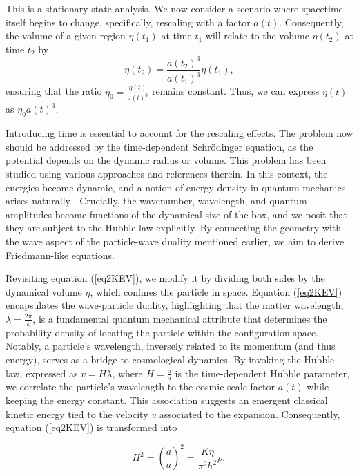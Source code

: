 \documentclass{article}
\begin{document}
This is a stationary state analysis. We now consider a scenario where spacetime itself begins to change, specifically, rescaling with a factor $a(t)$. Consequently, the volume of a given region $\eta(t_1)$ at time $t_1$ will relate to the volume $\eta(t_2)$ at time $t_2$ by
\begin{equation}
\eta(t_2) = \frac{a(t_2)^3}{a(t_1)^3}\eta(t_1), \label{eq:VolumeScale}
\end{equation}
ensuring that the ratio $\eta_0 = \frac{\eta(t)}{a(t)^3}$ remains constant. Thus, we can express $\eta(t)$ as $\eta_0 a(t)^3$.

Introducing time is essential to account for the rescaling effects. The problem now should be addressed by the time-dependent Schr{\"o}dinger equation, as the potential depends on the dynamic radius or volume. This problem has been studied using various approaches \cite{Cooney} and references therein. In this context, the energies become dynamic, and a notion of energy density in quantum mechanics arises naturally \cite{francisco}. Crucially, the wavenumber, wavelength, and quantum amplitudes become functions of the dynamical size of the box, and we posit that they are subject to the Hubble law explicitly. By connecting the geometry with the wave aspect of the particle-wave duality mentioned earlier, we aim to derive Friedmann-like equations.

Revisiting equation (\ref{eq2KEV}), we modify it by dividing both sides by the dynamical volume $\eta$, which confines the particle in space. Equation (\ref{eq2KEV}) encapsulates the wave-particle duality, highlighting that the matter wavelength, $\lambda = \frac{2 \pi}{k}$, is a fundamental quantum mechanical attribute that determines the probability density of locating the particle within the configuration space. Notably, a particle's wavelength, inversely related to its momentum (and thus energy), serves as a bridge to cosmological dynamics. By invoking the Hubble law, expressed as $v = H \lambda$, where $H = \frac{\dot{a}}{a}$ is the time-dependent Hubble parameter, we correlate the particle's wavelength to the cosmic scale factor $a(t)$ while keeping the energy constant. This association suggests an emergent classical kinetic energy tied to the velocity $v$ associated to the expansion. Consequently, equation (\ref{eq2KEV}) is transformed into

\begin{equation}
H^2 = \left( \frac{\dot{a}}{a} \right)^2 = \frac{K\eta}{\pi^2 \hbar^2} \rho, \label{eq:Friedmann1fromQuantum}
\end{equation}
\end{document}
